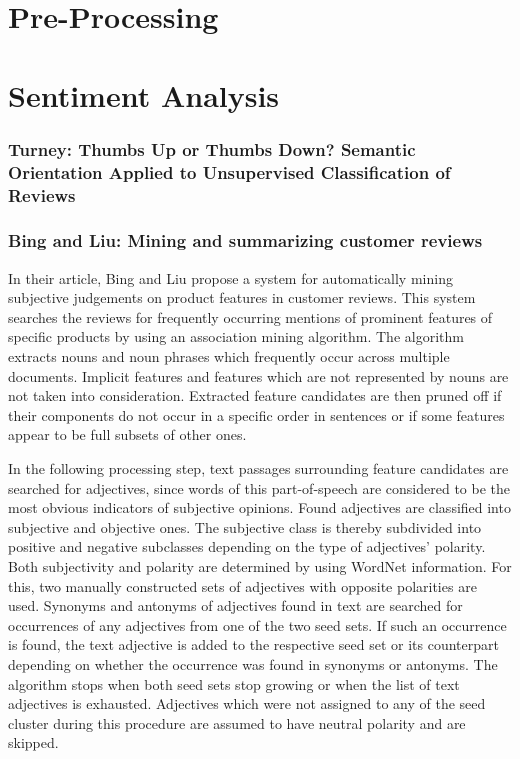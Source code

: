 \documentclass[a4paper,11pt]{article}
\begin{document}
\section{Pre-Processing}

\section{Sentiment Analysis}
\subsubsection{Turney: Thumbs Up or Thumbs Down? Semantic Orientation Applied to
               Unsupervised Classification of Reviews\cite{Turney-02}}

\subsubsection{Bing and Liu: Mining and summarizing customer reviews\cite{Bing-Liu-04}}
In their article, Bing and Liu \cite{Bing-Liu-04} propose a system for
automatically mining subjective judgements on product features in customer
reviews.  This system searches the reviews for frequently occurring mentions
of prominent features of specific products by using an association mining
algorithm.  The algorithm extracts nouns and noun phrases which frequently
occur across multiple documents.  Implicit features and features which are not
represented by nouns are not taken into consideration.  Extracted feature
candidates are then pruned off if their components do not occur in a specific
order in sentences or if some features appear to be full subsets of other
ones.

In the following processing step, text passages surrounding feature candidates
are searched for adjectives, since words of this part-of-speech are considered
to be the most obvious indicators of subjective opinions.  Found adjectives
are classified into subjective and objective ones.  The subjective class is
thereby subdivided into positive and negative subclasses depending on the type
of adjectives' polarity.  Both subjectivity and polarity are determined by
using WordNet information.  For this, two manually constructed sets of
adjectives with opposite polarities are used.  Synonyms and antonyms of
adjectives found in text are searched for occurrences of any adjectives from
one of the two seed sets.  If such an occurrence is found, the text adjective
is added to the respective seed set or its counterpart depending on whether
the occurrence was found in synonyms or antonyms.  The algorithm stops when
both seed sets stop growing or when the list of text adjectives is exhausted.
Adjectives which were not assigned to any of the seed cluster during this
procedure are assumed to have neutral polarity and are skipped.
\end{document}
